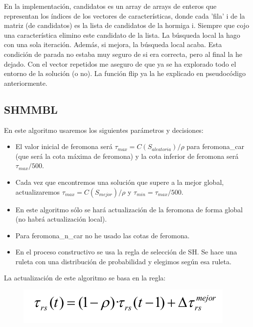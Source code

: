 En la implementación, candidatos es un array de arrays de enteros que representan los índices de los vectores de características, donde cada 'fila' i de la matriz (de candidatos) es la lista de candidatos de la hormiga i. Siempre que cojo una característica elimino este candidato de la lista. La búsqueda local la hago con una sola iteración. Además, si mejora, la búsqueda local acaba. Esta condición de parada no estaba muy seguro de si era correcta, pero al final la he dejado. Con el vector repetidos me aseguro de que ya se ha explorado todo el entorno de la solución (o no). La función flip ya la he explicado en pseudocódigo anteriormente.



\subsection{SHMMBL}

En este algoritmo usaremos los siguientes parámetros y decisiones:

\begin{itemize}
	\item El valor inicial de feromona será $\tau_{max}=C(S_{aleatoria})/\rho$ para feromona\_car (que será la cota máxima de feromona) y la cota inferior de feromona será $\tau_{max}/500$.
	
	\item Cada vez que encontremos una solución que supere a la mejor global, actualizaremos $\tau_{max}=C(S_{mejor})/\rho$ y $\tau_{min}=\tau_{max}/500$.
	
	\item En este algoritmo sólo se hará actualización de la feromona de forma global (no habrá actualización local).
	
	\item Para feromona\_n\_car no he usado las cotas de feromona.
	
	\item En el proceso constructivo se usa la regla de selección de SH. Se hace una ruleta con una distribución de probabilidad y elegimos según esa ruleta.
\end{itemize}

La actualización de este algoritmo se basa en la regla:
\begin{figure} [H]
\centering
\includegraphics[width=0.7\linewidth]{actualizacionshmml}
\label{fig:actualizacionshmml}
\end{figure}

